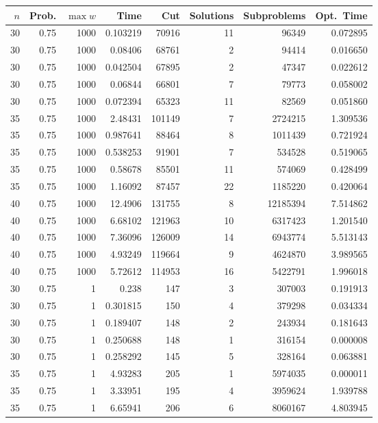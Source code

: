 \documentclass[a4paper,11pt]{article}
\begin{document}
\begin{table}
\begin{center}
\begin{tabular}{|rrr|r|r|rr|r|}
\hline
$n$ & Prob. & $\max w$ & Time & Cut & Solutions & Subproblems & Opt.\ Time \\
\hline
30 & 0.75 & 1000 & 0.103219 & 70916 & 11 & 96349 & 0.072895 \\
30 & 0.75 & 1000 & 0.08406 & 68761 & 2 & 94414 & 0.016650 \\
30 & 0.75 & 1000 & 0.042504 & 67895 & 2 & 47347 & 0.022612 \\
30 & 0.75 & 1000 & 0.06844 & 66801 & 7 & 79773 & 0.058002 \\
30 & 0.75 & 1000 & 0.072394 & 65323 & 11 & 82569 & 0.051860 \\
35 & 0.75 & 1000 & 2.48431 & 101149 & 7 & 2724215 & 1.309536 \\
35 & 0.75 & 1000 & 0.987641 & 88464 & 8 & 1011439 & 0.721924 \\
35 & 0.75 & 1000 & 0.538253 & 91901 & 7 & 534528 & 0.519065 \\
35 & 0.75 & 1000 & 0.58678 & 85501 & 11 & 574069 & 0.428499 \\
35 & 0.75 & 1000 & 1.16092 & 87457 & 22 & 1185220 & 0.420064 \\
40 & 0.75 & 1000 & 12.4906 & 131755 & 8 & 12185394 & 7.514862 \\
40 & 0.75 & 1000 & 6.68102 & 121963 & 10 & 6317423 & 1.201540 \\
40 & 0.75 & 1000 & 7.36096 & 126009 & 14 & 6943774 & 5.513143 \\
40 & 0.75 & 1000 & 4.93249 & 119664 & 9 & 4624870 & 3.989565 \\
40 & 0.75 & 1000 & 5.72612 & 114953 & 16 & 5422791 & 1.996018 \\
\hline
30 & 0.75 & 1 & 0.238 & 147 & 3 & 307003 & 0.191913 \\
30 & 0.75 & 1 & 0.301815 & 150 & 4 & 379298 & 0.034334 \\
30 & 0.75 & 1 & 0.189407 & 148 & 2 & 243934 & 0.181643 \\
30 & 0.75 & 1 & 0.250688 & 148 & 1 & 316154 & 0.000008 \\
30 & 0.75 & 1 & 0.258292 & 145 & 5 & 328164 & 0.063881 \\
35 & 0.75 & 1 & 4.93283 & 205 & 1 & 5974035 & 0.000011 \\
35 & 0.75 & 1 & 3.33951 & 195 & 4 & 3959624 & 1.939788 \\
35 & 0.75 & 1 & 6.65941 & 206 & 6 & 8060167 & 4.803945 \\

\end{tabular}
\end{center}
\end{table}
\end{document}
